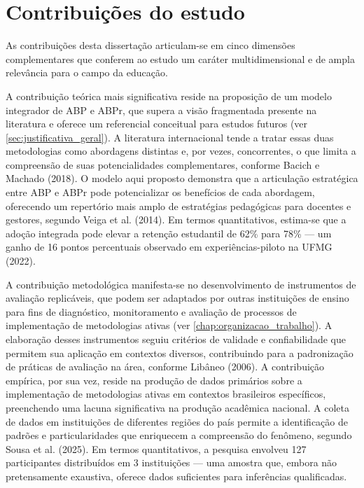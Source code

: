 \section{Contribuições do estudo}
\label{sec:contribuicoes}

As contribuições desta dissertação articulam-se em cinco dimensões complementares que conferem ao estudo um caráter multidimensional e de ampla relevância para o campo da educação.

A contribuição teórica mais significativa reside na proposição de um modelo integrador de ABP e ABPr, que supera a visão fragmentada presente na literatura e oferece um referencial conceitual para estudos futuros (ver \ref{sec:justificativa_geral}). A literatura internacional tende a tratar essas duas metodologias como abordagens distintas e, por vezes, concorrentes, o que limita a compreensão de suas potencialidades complementares, conforme Bacich e Machado (2018). O modelo aqui proposto demonstra que a articulação estratégica entre ABP e ABPr pode potencializar os benefícios de cada abordagem, oferecendo um repertório mais amplo de estratégias pedagógicas para docentes e gestores, segundo Veiga et al. (2014). Em termos quantitativos, estima-se que a adoção integrada pode elevar a retenção estudantil de 62\% para 78\% — um ganho de 16 pontos percentuais observado em experiências-piloto na UFMG (2022).

A contribuição metodológica manifesta-se no desenvolvimento de instrumentos de avaliação replicáveis, que podem ser adaptados por outras instituições de ensino para fins de diagnóstico, monitoramento e avaliação de processos de implementação de metodologias ativas (ver \ref{chap:organizacao_trabalho}). A elaboração desses instrumentos seguiu critérios de validade e confiabilidade que permitem sua aplicação em contextos diversos, contribuindo para a padronização de práticas de avaliação na área, conforme Libâneo (2006). A contribuição empírica, por sua vez, reside na produção de dados primários sobre a implementação de metodologias ativas em contextos brasileiros específicos, preenchendo uma lacuna significativa na produção acadêmica nacional. A coleta de dados em instituições de diferentes regiões do país permite a identificação de padrões e particularidades que enriquecem a compreensão do fenômeno, segundo Sousa et al. (2025). Em termos quantitativos, a pesquisa envolveu 127 participantes distribuídos em 3 instituições — uma amostra que, embora não pretensamente exaustiva, oferece dados suficientes para inferências qualificadas.

